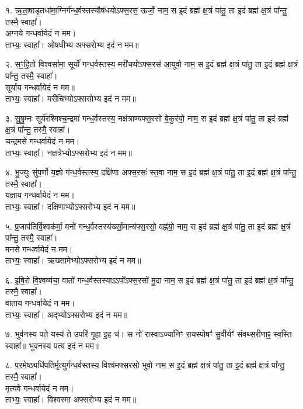 १. ऋ॒ता॒षाडृ॒तधा॑मा॒ग्निर्ग॑न्ध॒र्वस्तस्यौष॑धयोऽफ्स॒रस॒ ऊर्जो॒ नाम॒
स इ॒दं ब्रह्म॑ क्ष॒त्रं पा॑तु॒ ता इ॒दं ब्रह्म॑ क्ष॒त्रं पा᳚न्तु॒ तस्मै॒ स्वाहा᳚। \\
अग्नये गन्धर्वायेदं न मम।\\
ताभ्यः॒ स्वाहा᳚। ओषधीभ्य अफ्सरोभ्य इदं न मम॥

२. स॒ꣳ॒हि॒तो वि॒श्वसा॑मा॒ सूर्यो॑ गन्ध॒र्वस्तस्य॒ मरी॑चयोऽफ्स॒रस॑ आ॒युवो॒ नाम॒ स इ॒दं ब्रह्म॑ क्ष॒त्रं पा॑तु॒ ता इ॒दं ब्रह्म॑ क्ष॒त्रं पा᳚न्तु॒ तस्मै॒ स्वाहा᳚।\\
सूर्याय गन्धर्वायेदं न मम॥\\
ताभ्यः॒ स्वाहा᳚। मरीचिभ्योऽफ्ससोभ्य इदं न मम॥

३. सु॒षु॒म्नः सूर्य॑रश्मिश्च॒न्द्रमा॑ गन्ध॒र्वस्तस्य॒ नक्ष॑त्राण्यफ्स॒रसो॑ बे॒कुर॑यो॒ नाम॒ स इ॒दं ब्रह्म॑ क्ष॒त्रं पा॑तु॒ ता इ॒दं ब्रह्म॑ क्ष॒त्रं पा᳚न्तु॒ तस्मै॒ स्वाहा᳚।\\
चन्द्रमसे गन्धर्वायेदं न मम।\\
ताभ्यः॒ स्वाहा᳚। नक्षत्रेभ्योऽफ्सरोभ्य इदं न मम॥

४. भु॒ज्युः सु॑प॒र्णो य॒ज्ञो ग॑न्ध॒र्वस्तस्य॒ दक्षि॑णा अफ्स॒रसः॑ स्त॒वा नाम॒ स इ॒दं ब्रह्म॑ क्ष॒त्रं पा॑तु॒ ता इ॒दं ब्रह्म॑ क्ष॒त्रं पा᳚न्तु॒ तस्मै॒ स्वाहा᳚।\\
यज्ञाय गन्धर्वायेदं न मम।\\
ताभ्यः॒ स्वाहा᳚। दक्षिणाभ्योऽफ्सरोभ्य इदं न मम॥

५. प्र॒जाप॑तिर्वि॒श्वक॑र्मा॒ मनो॑ गन्ध॒र्वस्तस्य॑र्ख्सा॒मान्य॑फ्स॒रसो॒ वह्न॑यो॒ नाम॒ स इ॒दं ब्रह्म॑ क्ष॒त्रं पा॑तु॒ ता इ॒दं ब्रह्म॑ क्ष॒त्रं पा᳚न्तु॒ तस्मै॒ स्वाहा᳚।\\
मनसे गन्धर्वायेदं न मम।\\
ताभ्यः॒ स्वाहा᳚। ऋख्सामेभ्योऽफ्सरोभ्य इदं न मम॥

६. इ॒षि॒रो वि॒श्वव्य॑चा॒ वातो॑ गन्ध॒र्वस्तस्याऽऽपो᳚ऽफ्स॒रसो॑ मु॒दा नाम॒ स इ॒दं ब्रह्म॑ क्ष॒त्रं पा॑तु॒ ता इ॒दं ब्रह्म॑ क्ष॒त्रं पा᳚न्तु॒ तस्मै॒ स्वाहा᳚।\\
वाताय गन्धर्वायेदं न मम।\\
ताभ्यः॒ स्वाहा᳚। अद्भ्योऽफ्सरोभ्य इदं न मम॥

७. भुव॑नस्य पते॒ यस्य॑ ते उ॒परि॑ गृ॒हा इ॒ह च॑।
स नो॑ रास्वाऽज्या॑निꣳ रा॒यस्पोषꣳ॑ सु॒वीर्यꣳ॑ संवथ्स॒रीणाꣴ॒ स्व॒स्ति स्वाहा᳚॥ भुवनस्य पत्य इदं न मम॥

८. प॒र॒मे॒ष्ठ्यधि॑पतिर्मृ॒त्युर्ग॑न्ध॒र्वस्तस्य॒ विश्व॑मफ्स॒रसो॒ भुवो॒ नाम॒ स इ॒दं ब्रह्म॑ क्ष॒त्रं पा॑तु॒ ता इ॒दं ब्रह्म॑ क्ष॒त्रं पा᳚न्तु॒ तस्मै॒ स्वाहा᳚।\\
मृत्यवे गन्धर्वायेदं न मम।\\
ताभ्यः॒ स्वाहा᳚। विश्वस्मा अफ्सरोभ्य इदं न मम॥

